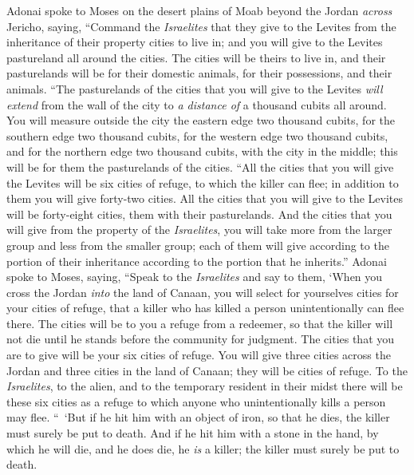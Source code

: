 \begin{biblechapter} %
 Adonai spoke to Moses on the desert plains of Moab beyond the Jordan \textit{across} Jericho, saying,
\verse “Command the \textit{Israelites} that they give to the Levites from the inheritance of their property cities to live in; and you will give to the Levites pastureland all around the cities.
\verse The cities will be theirs to live in, and their pasturelands will be for their domestic animals, for their possessions, and their animals.
\verse “The pasturelands of the cities that you will give to the Levites \textit{will extend} from the wall of the city to \textit{a distance of} a thousand cubits all around.
\verse You will measure outside the city the eastern edge two thousand cubits, for the southern edge two thousand cubits, for the western edge two thousand cubits, and for the northern edge two thousand cubits, with the city in the middle; this will be for them the pasturelands of the cities.
\verse “All the cities that you will give the Levites will be six cities of refuge, to which the killer can flee; in addition to them you will give forty-two cities.
\verse All the cities that you will give to the Levites will be forty-eight cities, them with their pasturelands.
\verse And the cities that you will give from the property of the \textit{Israelites}, you will take more from the larger group and less from the smaller group; each of them will give according to the portion of their inheritance according to the portion that he inherits.”
 Adonai spoke to Moses, saying,
\verse “Speak to the \textit{Israelites} and say to them, ‘When you cross the Jordan \textit{into} the land of Canaan,
\verse you will select for yourselves cities for your cities of refuge, that a killer who has killed a person unintentionally can flee there.
\verse The cities will be to you a refuge from a redeemer, so that the killer will not die until he stands before the community for judgment.
\verse The cities that you are to give will be your six cities of refuge.
\verse You will give three cities across the Jordan and three cities in the land of Canaan; they will be cities of refuge.
\verse To the \textit{Israelites}, to the alien, and to the temporary resident in their midst there will be these six cities as a refuge to which anyone who unintentionally kills a person may flee.
\verse “ ‘But if he hit him with an object of iron, so that he dies, the killer must surely be put to death.
\verse And if he hit him with a stone in the hand, by which he will die, and he does die, he \textit{is} a killer; the killer must surely be put to death.

\end{biblechapter}
